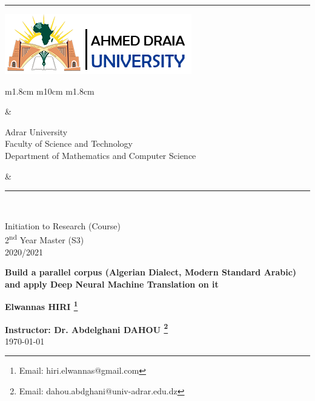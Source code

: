 \documentclass[paper=a4, fontsize=11pt]{scrartcl}
\numberwithin{equation}{section}		%
\numberwithin{figure}{section}			%
\numberwithin{table}{section}				%
\newcommand{\horrule}[1]{\rule{\linewidth}{#1}} 	%
\begin{document}
		
{\flushleft\horrule{2pt}
\begin{center}
{\includegraphics[height=0.09\textwidth]{Figs/logo_english.png}} 
\begin{tabular}{ m{1.8cm} m{10cm} m{1.8cm}}
\begin{center}
\end{center}
&
\begin{center} 
{\small
{Adrar University} \\
{Faculty of Science and Technology} \\
{Department of Mathematics and Computer Science}} \\

\end{center}
&

\begin{center}
\end{center}
\end{tabular}
\end{center}
\flushleft \horrule{2pt}\\[1cm]
}


\begin{center}

{
\huge  
Initiation to Research (Course) \\
\vspace{0.2cm}
2\textsuperscript{nd} Year Master (S3) \\
\vspace{0.2cm}
2020/2021}\\

\vspace{1cm}

{
\Huge   
\textbf{Build a parallel corpus (Algerian Dialect,  Modern Standard Arabic) and apply Deep Neural Machine Translation on it }}\\
\vspace{1cm}

{
\Large
\textbf{Elwannas HIRI \footnote{Email: hiri.elwannas@gmail.com}}}\\
\vspace{3cm}

{
\large
\textbf{Instructor: Dr. Abdelghani DAHOU \footnote{Email: dahou.abdghani@univ-adrar.edu.dz}}}\\
\today
\end{center}
\pagebreak
\tableofcontents
\pagebreak
\listoffigures
\pagebreak
\end{document}

